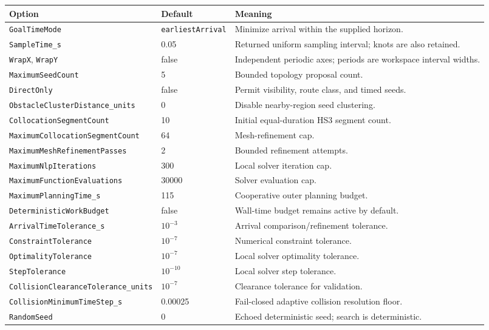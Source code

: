 \documentclass[10pt,letterpaper]{article}
\newcommand{\file}[1]{\nolinkurl{#1}}
\begin{document}
\begin{longtable}{@{}p{.36\linewidth}p{.22\linewidth}p{.34\linewidth}@{}}
\toprule
Option & Default & Meaning \\
\midrule
\endhead
\file{GoalTimeMode} & \file{earliestArrival} & Minimize arrival within the supplied horizon. \\
\file{SampleTime_s} & 0.05 & Returned uniform sampling interval; knots are also retained. \\
\file{WrapX}, \file{WrapY} & false & Independent periodic axes; periods are workspace interval widths. \\
\file{MaximumSeedCount} & 5 & Bounded topology proposal count. \\
\file{DirectOnly} & false & Permit visibility, route class, and timed seeds. \\
\file{ObstacleClusterDistance_units} & 0 & Disable nearby-region seed clustering. \\
\file{CollocationSegmentCount} & 10 & Initial equal-duration HS3 segment count. \\
\file{MaximumCollocationSegmentCount} & 64 & Mesh-refinement cap. \\
\file{MaximumMeshRefinementPasses} & 2 & Bounded refinement attempts. \\
\file{MaximumNlpIterations} & 300 & Local solver iteration cap. \\
\file{MaximumFunctionEvaluations} & 30000 & Solver evaluation cap. \\
\file{MaximumPlanningTime_s} & 115 & Cooperative outer planning budget. \\
\file{DeterministicWorkBudget} & false & Wall-time budget remains active by default. \\
\file{ArrivalTimeTolerance_s} & $10^{-3}$ & Arrival comparison/refinement tolerance. \\
\file{ConstraintTolerance} & $10^{-7}$ & Numerical constraint tolerance. \\
\file{OptimalityTolerance} & $10^{-7}$ & Local solver optimality tolerance. \\
\file{StepTolerance} & $10^{-10}$ & Local solver step tolerance. \\
\file{CollisionClearanceTolerance_units} & $10^{-7}$ & Clearance tolerance for validation. \\
\file{CollisionMinimumTimeStep_s} & 0.00025 & Fail-closed adaptive collision resolution floor. \\
\file{RandomSeed} & 0 & Echoed deterministic seed; search is deterministic. \\
\bottomrule
\end{longtable}
\end{document}

